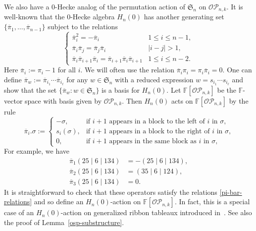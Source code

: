 \documentclass[ALCO,ThmDefs,published]{cedram}
\newcommand{\symm}{{\mathfrak{S}}}
\newcommand{\FF}{{\mathbb{F}}}
\theoremstyle{plain}
\newcommand{\symm}{{\mathfrak{S}}}
\newcommand{\OP}{{\mathcal{OP}}}
\newcommand{\FF}{{\mathbb{F}}}
\newcommand{\pib}{\overline{\pi}}
\begin{document}
We also have a 0-Hecke analog of the permutation action of $\symm_n$ on $\OP_{n,k}$.
It is well-known that the 0-Hecke algebra $H_n(0)$ has another generating set $\{\pib_1,\ldots,\pib_{n-1}\}$ subject to the relations
\begin{equation}\label{pi-bar-relations}
\begin{cases}
\pib_i^2 =  -\pib_i & 1 \leq i \leq n-1, \\
\pib_i \pib_j = \pib_j \pib_i & |i - j| > 1,  \\
\pib_i \pib_{i+1} \pib_i = \pib_{i+1} \pib_i \pib_{i+1} & 1 \leq i \leq n-2.
\end{cases}
\end{equation}
Here $\pib_i:=\pi_i-1$ for all $i$.
We will often use the relation $\pib_i\pi_i = \pi_i\pib_i=0$.
One can define $\pib_w:=\pib_{i_1}\cdots\pib_{i_\ell}$ for any $w\in\symm_n$ with a reduced expression $w=s_{i_1}\cdots s_{i_\ell}$ and show that the set $\{\pib_w:w\in\symm_n\}$ is a basis for $H_n(0)$.
Let $\FF[\OP_{n,k}]$ be the $\FF$-vector space with basis given by $\OP_{n,k}$.
Then $H_n(0)$ acts on $\FF[\OP_{n,k}]$ by the rule
\begin{equation}
\label{pi-defining-action}
\pib_i . \sigma := \begin{cases}
-\sigma, & \text{if $i+1$ appears in a block to the left of $i$ in $\sigma$,} \\
s_i(\sigma), & \text{if $i+1$ appears in a block to the right of $i$ in $\sigma$,} \\
0, & \text{if $i+1$ appears in the same block as $i$ in $\sigma$,} 
\end{cases}
\end{equation}
For example, we have
\begin{align*}
\pib_1 (25 \mid 6 \mid 134) &= -(25 \mid 6 \mid 134),  \\
\pib_2 (25 \mid 6 \mid 134) &= (35 \mid 6 \mid 124), \\
\pib_3 (25 \mid 6 \mid 134) &= 0.
\end{align*}
It is straightforward to check that these operators satisfy the relations \eqref{pi-bar-relations}
and so define an $H_n(0)$-action on $\FF[\OP_{n,k}]$. 
In fact, this is a special case of an $H_n(0)$-action on generalized ribbon tableaux introduced in~\cite{HuangTab}.
See also the proof of Lemma~\ref{osp-substructure}.
\end{document}
